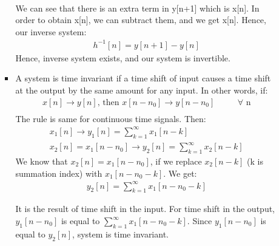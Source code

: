 \documentclass[10pt,a4paper, margin=1in]{article}
\begin{document}
\begin{enumerate}
\begin{enumerate}
\begin{itemize}
\begin{gather*}
    \end{gather*}
    We can see that there is an extra term in y[n+1] which is x[n]. In order to obtain x[n], we can subtract them, and we get x[n]. Hence, our inverse system:
    \begin{gather*}
        h^{-1}[n] = y[n+1]-y[n]
    \end{gather*}
    Hence, inverse system exists, and our system is invertible.
    \item A system is time invariant if a time shift of input causes a time shift at the output by the same amount for any input. In other words, if:
     \begin{gather*}
        x[n] \rightarrow y[n] \text{, then } x[n-n_0] \rightarrow y[n-n_0] \text{      $\qquad  \forall $  n} \\
     \end{gather*}
     The rule is same for continuous time signals. Then:
     \begin{gather*}
         x_1[n] \rightarrow y_1[n] = \sum_{k=1}^\infty x_1[n-k] \\
         x_2[n] = x_1[n-n_0] \rightarrow y_2[n]=  \sum_{k=1}^\infty x_2[n-k]
     \end{gather*}
     We know that $ x_2[n] = x_1[n-n_0]$, if we replace $x_2[n-k]$ (k is summation index) with $x_1[n-n_0-k]$. We get:
     \begin{gather*}
         y_2[n] = \sum_{k=1}^\infty x_1[n-n_0-k]
     \end{gather*}
     
     It is the result of time shift in the input. For time shift in the output, $y_1[n-n_0]$ is equal to $\sum_{k=1}^\infty x_1[n-n_0-k]$. Since $y_1[n-n_0]$ is equal to $y_2[n]$, system is time invariant. \\
    \end{itemize}
    

\end{enumerate}
\end{enumerate}
\end{document}
